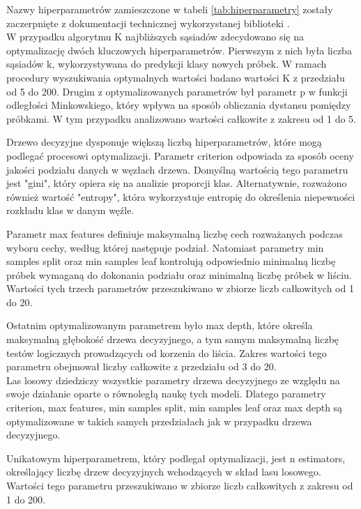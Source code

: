 \documentclass[a4paper,twoside,12pt]{book}
\begin{document}

Nazwy hiperparametrów zamieszczone w tabeli \ref{tab:hiperparametry} zostały zaczerpnięte z dokumentacji technicznej wykorzystanej biblioteki \cite{sklearn_api}.\\

W przypadku algorytmu K najbliższych sąsiadów zdecydowano się na optymalizację dwóch kluczowych hiperparametrów. Pierwszym z nich była liczba sąsiadów k, wykorzystywana do predykcji klasy nowych próbek. W ramach procedury wyszukiwania optymalnych wartości badano wartości K z przedziału od 5 do 200. Drugim z optymalizowanych parametrów był parametr p w funkcji odległości Minkowskiego, który wpływa na sposób obliczania dystansu pomiędzy próbkami. W tym przypadku analizowano wartości całkowite z zakresu od 1 do 5.

Drzewo decyzyjne dysponuje większą liczbą hiperparametrów, które mogą podlegać procesowi optymalizacji. Parametr criterion odpowiada za sposób oceny jakości podziału danych w węzłach drzewa. Domyślną wartością tego parametru jest "gini", który opiera się na analizie proporcji klas. Alternatywnie, rozważono również wartość "entropy", która wykorzystuje entropię do określenia niepewności rozkładu klas w danym węźle.

Parametr max features definiuje maksymalną liczbę cech rozważanych podczas wyboru cechy, według której następuje podział. Natomiast parametry min samples split oraz min samples leaf kontrolują odpowiednio minimalną liczbę próbek wymaganą do dokonania podziału oraz minimalną liczbę próbek w liściu. Wartości tych trzech parametrów przeszukiwano w zbiorze liczb całkowitych od 1 do 20.

Ostatnim optymalizowanym parametrem było max depth, które określa maksymalną głębokość drzewa decyzyjnego, a tym samym maksymalną liczbę testów logicznych prowadzących od korzenia do liścia. Zakres wartości tego parametru obejmował liczby całkowite z przedziału od 3 do 20.\\


Las losowy dziedziczy wszystkie parametry drzewa decyzyjnego ze względu na swoje działanie oparte o równoległą naukę tych modeli. Dlatego parametry criterion, max features, min samples split, min samples leaf oraz max depth są optymalizowane w takich samych przedziałach jak w przypadku drzewa decyzyjnego.

Unikatowym hiperparametrem, który podlegał optymalizacji, jest n estimators, określający liczbę drzew decyzyjnych wchodzących w skład lasu losowego. Wartości tego parametru przeszukiwano w zbiorze liczb całkowitych z zakresu od 1 do 200.\\
\end{document}
